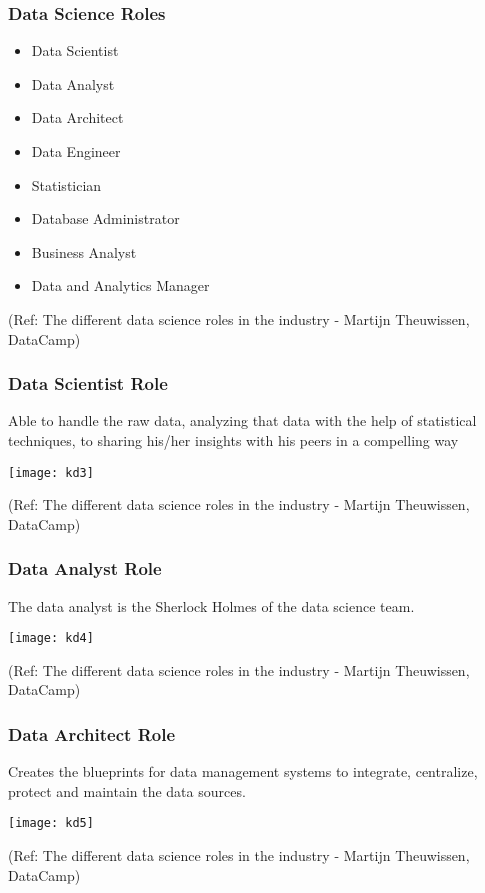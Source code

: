 \begin{frame}[fragile]\frametitle{Data Science Roles}
\begin{itemize}
\item Data Scientist
\item Data Analyst
\item Data Architect
\item Data Engineer
\item Statistician
\item Database Administrator
\item Business Analyst
\item Data and Analytics Manager
\end{itemize}

{\tiny (Ref: The different data science roles in the industry - Martijn Theuwissen, DataCamp)}
\end{frame}

\begin{frame}[fragile]\frametitle{Data Scientist Role}
Able to handle the raw data, analyzing that data with the help of statistical techniques, to sharing his/her insights with his peers in a compelling way
\begin{center}
\texttt{[image: kd3]}
\end{center}

{\tiny (Ref: The different data science roles in the industry - Martijn Theuwissen, DataCamp)}
\end{frame}

\begin{frame}[fragile]\frametitle{Data Analyst Role}
The data analyst is the Sherlock Holmes of the data science team. 

\begin{center}
\texttt{[image: kd4]}
\end{center}

{\tiny (Ref: The different data science roles in the industry - Martijn Theuwissen, DataCamp)}
\end{frame}

\begin{frame}[fragile]\frametitle{Data Architect Role}
Creates the blueprints for data management systems to integrate, centralize, protect and maintain the data sources. 

\begin{center}
\texttt{[image: kd5]}
\end{center}

{\tiny (Ref: The different data science roles in the industry - Martijn Theuwissen, DataCamp)}
\end{frame}


